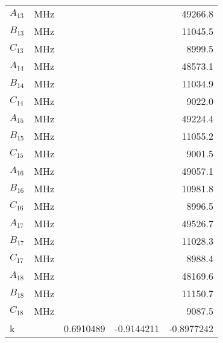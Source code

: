\begin{table}
\begin{tabular}{lrrrr}
$A_{13   }$ &      MHz &                 &                 &         49266.8 \\
$B_{13   }$ &      MHz &                 &                 &         11045.5 \\
$C_{13   }$ &      MHz &                 &                 &          8999.5 \\
$A_{14   }$ &      MHz &                 &                 &         48573.1 \\
$B_{14   }$ &      MHz &                 &                 &         11034.9 \\
$C_{14   }$ &      MHz &                 &                 &          9022.0 \\
$A_{15   }$ &      MHz &                 &                 &         49224.4 \\
$B_{15   }$ &      MHz &                 &                 &         11055.2 \\
$C_{15   }$ &      MHz &                 &                 &          9001.5 \\
$A_{16   }$ &      MHz &                 &                 &         49057.1 \\
$B_{16   }$ &      MHz &                 &                 &         10981.8 \\
$C_{16   }$ &      MHz &                 &                 &          8996.5 \\
$A_{17   }$ &      MHz &                 &                 &         49526.7 \\
$B_{17   }$ &      MHz &                 &                 &         11028.3 \\
$C_{17   }$ &      MHz &                 &                 &          8988.4 \\
$A_{18   }$ &      MHz &                 &                 &         48169.6 \\
$B_{18   }$ &      MHz &                 &                 &         11150.7 \\
$C_{18   }$ &      MHz &                 &                 &          9087.5 \\
k      &          &       0.6910489 &      -0.9144211 &      -0.8977242 \\
\end{tabular}
\end{table}
